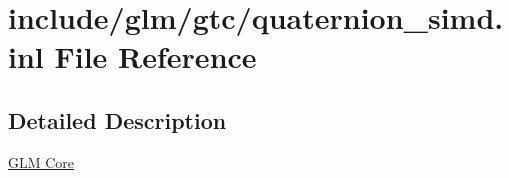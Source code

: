 \hypertarget{quaternion__simd_8inl}{}\section{include/glm/gtc/quaternion\+\_\+simd.inl File Reference}
\label{quaternion__simd_8inl}


\subsection{Detailed Description}
\hyperlink{group__core}{G\+LM Core} 